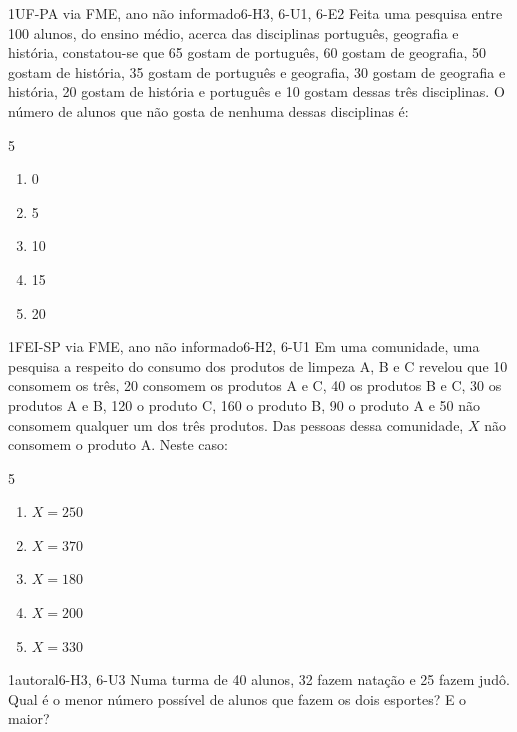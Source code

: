 \begin{questao}{1}{UF-PA via FME, ano não informado}{6-H3, 6-U1, 6-E2}\label{u6:ufpa24}
Feita uma pesquisa entre 100 alunos, do ensino médio, acerca das disciplinas português, geografia e história, constatou-se que 65 gostam de português, 60 gostam de geografia, 50 gostam de história, 35 gostam de português e geografia, 30 gostam de geografia e história, 20 gostam de história e português e 10 gostam dessas três disciplinas. O número de alunos que não gosta de nenhuma dessas disciplinas é:
\begin{multicols}{5}
\begin{enumerate}[label=\alph*)]
  \item 0
  \item 5
  \item 10
  \item 15
  \item 20
\end{enumerate}
\end{multicols}
\end{questao}

\begin{questao}{1}{FEI-SP via FME, ano não informado}{6-H2, 6-U1}\label{u6:fei23}
Em uma comunidade, uma pesquisa a respeito do consumo dos produtos de limpeza A, B e C revelou que 10 consomem os três, 20 consomem os produtos A e C, 40 os produtos B e C, 30 os produtos A e B, 120 o produto C, 160 o produto B, 90 o produto A e 50 não consomem qualquer um dos três produtos. Das pessoas dessa comunidade, $X$ não consomem o produto A. Neste caso:
\begin{multicols}{5}
\begin{enumerate}[label=\alph*)]
  \item $X=250$
  \item $X=370$
  \item $X=180$
  \item $X=200$
  \item $X=330$
\end{enumerate}
\end{multicols}
\end{questao}

\begin{questao}{1}{autoral}{6-H3, 6-U3}\label{u6:natacao}
Numa turma de 40 alunos, 32 fazem natação e 25 fazem judô. Qual é o menor número possível de alunos que fazem os dois esportes? E o maior?
\end{questao}

